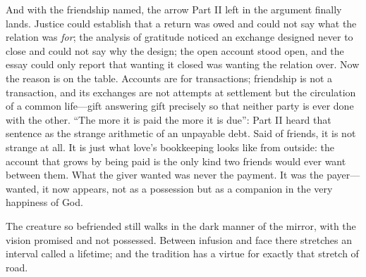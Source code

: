 And with the friendship named, the arrow Part II left in the argument finally lands. Justice could establish that a return was owed and could not say what the relation was \emph{for}; the analysis of gratitude noticed an exchange designed never to close and could not say why the design; the open account stood open, and the essay could only report that wanting it closed was wanting the relation over. Now the reason is on the table. Accounts are for transactions; friendship is not a transaction, and its exchanges are not attempts at settlement but the circulation of a common life---gift answering gift precisely so that neither party is ever done with the other. ``The more it is paid the more it is due'': Part II heard that sentence as the strange arithmetic of an unpayable debt. Said of friends, it is not strange at all. It is just what love's bookkeeping looks like from outside: the account that grows by being paid is the only kind two friends would ever want between them. What the giver wanted was never the payment. It was the payer---wanted, it now appears, not as a possession but as a companion in the very happiness of God.

The creature so befriended still walks in the dark manner of the mirror, with the vision promised and not possessed. Between infusion and face there stretches an interval called a lifetime; and the tradition has a virtue for exactly that stretch of road.
